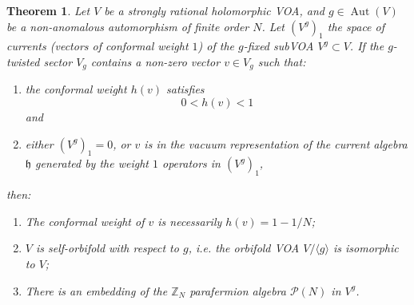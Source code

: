 \documentclass[10pt,a4paper]{amsart}
\newtheorem{theorem}{Theorem}
\DeclareMathOperator{\Aut}{Aut}
\DeclareMathOperator{\Com}{Com}
\newcommand{\ZZ}{\mathbb{Z}}
\newcommand{\alg}[1]{\mathfrak{#1}}
\newcommand{\paraf}{\mathcal{P}}
\begin{document}
\begin{theorem}\label{th:paraf}
	Let $V$ be a strongly rational holomorphic VOA, and $g\in \Aut(V)$ be a non-anomalous automorphism of finite order $N$. Let $(V^g)_1$ the space of currents (vectors of conformal weight $1$) of  the $g$-fixed subVOA $V^g\subset V$. If the $g$-twisted sector $V_g$ contains a non-zero vector $v\in V_g$ such that:
	\begin{enumerate}
		\item the conformal weight $h(v)$ satisfies
		$$ 0<h(v)<1
		$$ and
		\item either $(V^g)_1=0$, or $v$ is in the vacuum representation of the current algebra $\alg{h}$ generated by the weight $1$ operators in $(V^g)_1$,
	\end{enumerate} then:
	\begin{enumerate}
		\item The conformal weight of $v$ is necessarily $h(v)=1-1/N$;
		\item $V$ is self-orbifold with respect to $g$, i.e. the orbifold VOA $V/\langle g\rangle$ is isomorphic to $V$;
		\item There is an embedding of the $\ZZ_N$ parafermion algebra $\paraf(N)$ in $V^g$. %
	\end{enumerate} 
\end{theorem}
\end{document}

